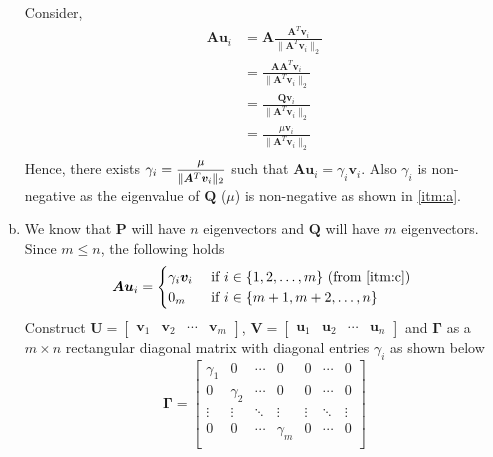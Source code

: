 \documentclass[a4paper]{article}
\begin{document}
\begin{enumerate}[(a)]
	Consider,
	\begin{equation}
		\begin{aligned}
			\bm{A}\bm{u}_i
			&=\bm{A}\frac{\bm{A}^T \bm{v}_i}{\|\bm{A}^T \bm{v}_i\|_2}\\
			&=\frac{\bm{A}\bm{A}^T \bm{v}_i}{\|\bm{A}^T \bm{v}_i\|_2}\\
			&=\frac{\bm{Q} \bm{v}_i}{\|\bm{A}^T \bm{v}_i\|_2}\\
			&=\frac{\mu \bm{v}_i}{\|\bm{A}^T \bm{v}_i\|_2}\\
		\end{aligned}
	\end{equation}
	Hence, there exists $\gamma_i=\mfrac{\mu}{\|\bm{A}^T \bm{v}_i\|_2}$ such that $\bm{A}\bm{u}_i=\gamma_i\bm{v}_i$.
	Also $\gamma_i$ is non-negative as the eigenvalue of $\bm{Q}$ ($\mu$) is non-negative as shown in \ref{itm:a}.
	\item We know that $\bm{P}$ will have $n$ eigenvectors and $\bm{Q}$ will have $m$ eigenvectors. Since $m\leq n$, the following holds 
	\begin{equation}{\label{eq:svduv}}
		\bm{A}\bm{u}_i=
		\begin{cases}
			\gamma_i\bm{v}_i & \text{ if } i\in \{1,2,\ldots,m\} \text{ (from \ref{itm:c}) }\\
			0_{m} & \text{ if } i\in \{m+1, m+2, \ldots, n\}
		\end{cases}
	\end{equation}
	Construct $\bm{U}=\begin{bmatrix}
		\bm{v}_1 & \bm{v}_2 & \cdots & \bm{v}_m
	\end{bmatrix}$,  $\bm{V}=\begin{bmatrix}
		\bm{u}_1 & \bm{u}_2 & \cdots & \bm{u}_n
	\end{bmatrix}$ and $\bm{\Gamma}$ as a $m\times n$ rectangular diagonal matrix with diagonal entries $\gamma_i$ as shown below
	\begin{equation}
		\bm{\Gamma}=\begin{bmatrix}
			\gamma_1 & 0 & \cdots & 0 & 0 & \cdots & 0\\
			0 & \gamma_2 & \cdots & 0 & 0 & \cdots & 0\\
			\vdots & \vdots & \ddots & \vdots & \vdots & \ddots & \vdots\\
			0 & 0 & \cdots & \gamma_m & 0 & \cdots & 0\\

\end{bmatrix}
\end{equation}
\end{enumerate}
\end{document}
